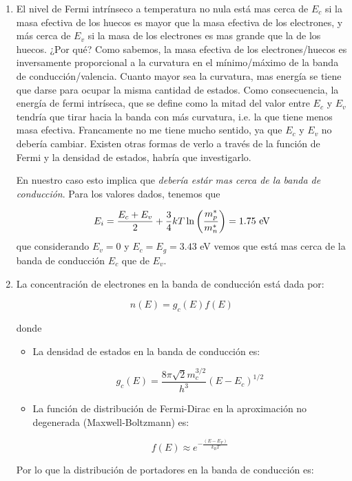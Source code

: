 \begin{enumerate}[label=\alph*)]
	\item El nivel de Fermi intrínseco a temperatura no nula está mas cerca de $E_c$ si la masa efectiva de los huecos es mayor que la masa efectiva de los electrones, y más cerca de $E_v$ si la masa de los electrones es mas grande que la de los huecos. ¿Por qué? Como sabemos, la masa efectiva de los electrones/huecos es inversamente proporcional a la curvatura en el mínimo/máximo de la banda de conducción/valencia. Cuanto mayor sea la curvatura, mas energía se tiene que darse para ocupar la misma cantidad de estados. Como consecuencia, la energía de fermi intríseca, que se define como la mitad del valor entre $E_c$ y $E_v$ tendría que tirar hacia la banda con más curvatura, i.e. la que tiene menos masa efectiva. \textcolor{BrickRed}{Francamente no me tiene mucho sentido, ya que $E_c$ y $E_v$ no debería cambiar. Existen otras formas de verlo a través de la función de Fermi y la densidad de estados, habría que investigarlo.}

	En nuestro caso esto implica que \textit{debería estár mas cerca de la banda de conducción}. Para los valores dados, tenemos que

	\begin{equation}
		  E_i = \frac{E_c+E_v}{2} + \frac{3}{4} kT \ln\left( \frac{m_p^*}{m_n^*} \right) = 1.75 \ \text{eV}
	\end{equation}
	que considerando $E_v=0$ y $E_c=E_g=3.43$ eV vemos que está mas cerca de la banda de conducción $E_c$ que de $E_v$.
	\item La concentración de electrones en la banda de conducción está dada por:

		  \[
			  n(E) = g_c(E) f(E)
		  \]

		  donde

		  \begin{itemize}
			  \item La densidad de estados en la banda de conducción es:

					\[
						g_c(E) = \frac{8\pi \sqrt{2} m_c^{3/2}}{h^3} (E - E_c)^{1/2}
					\]

			  \item La función de distribución de Fermi-Dirac en la aproximación no degenerada (Maxwell-Boltzmann) es:

					\[
						f(E) \approx e^{-\frac{(E - E_F)}{k_B T}}
					\]
		  \end{itemize}

		  Por lo que la distribución de portadores en la banda de conducción es:


\end{enumerate}
